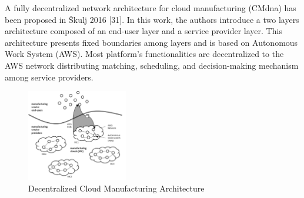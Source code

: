 A fully decentralized network architecture for cloud manufacturing (CMdna) has been proposed in Škulj 2016 [31]. In this work, the authors introduce a two layers architecture composed of an end-user layer and a service provider layer. This architecture presents fixed boundaries among layers and is based on Autonomous Work System (AWS). Most platform’s functionalities are decentralized to the AWS network distributing matching, scheduling, and decision-making mechanism among service providers.
\begin{figure}
    \centering
    \includegraphics[height=4cm, keepaspectratio]{images/decentralized-cmfg-architecture}
    \caption{Decentralized Cloud Manufacturing Architecture}
    \label{fig:decentralized-cmfg-architecture}
\end{figure}

